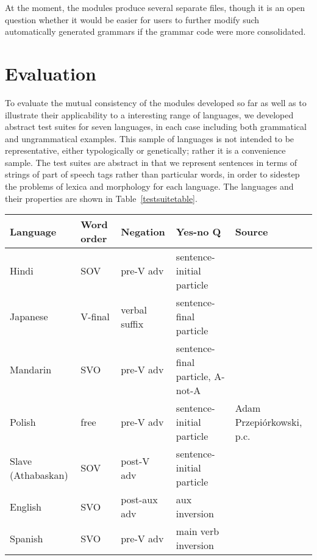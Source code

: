 At the moment, the modules produce
several separate files, though it is an open question whether
it would be easier for users to further modify such automatically
generated grammars if the grammar code were more consolidated.

\section{Evaluation}

To evaluate the mutual consistency of the modules developed so far as
well as to illustrate their applicability to a interesting range of
languages, we developed abstract test suites for seven languages, in
each case including both grammatical and ungrammatical examples.  This
sample of languages is not intended to be representative, either
typologically or genetically; rather it is a convenience sample.  The
test suites are abstract in that we represent sentences in terms of
strings of part of speech tags rather than particular words, in order
to sidestep the problems of lexica and morphology for each language.
The languages and their properties are shown in
Table~\ref{testsuitetable}.

\begin{table*}[ht]
\begin{center}
\small
\begin{tabular}{lllll}
\hline
Language & Word order & Negation & Yes-no Q\footnotemark & Source\\ \hline
Hindi    & SOV        & pre-V adv 	& sentence-initial particle& \cite{Sne:Wei:00}\\
Japanese & V-final    & verbal suffix   & sentence-final particle & \\
Mandarin & SVO	      & pre-V adv	& sentence-final particle, A-not-A & \cite{Li*81}\\
Polish   & free	      & pre-V adv       & sentence-initial particle & Adam Przepi\'{o}rkowski, p.c.\\
Slave (Athabaskan) & SOV & post-V adv	& sentence-initial particle & \cite{Rice89}\\
English  & SVO	      & post-aux adv\footnotemark	& aux inversion &\\
Spanish  & SVO	      & pre-V adv	& main verb inversion & \\ \hline
\end{tabular}
\end{center}
\caption{Languages used in testing}
\label{testsuitetable}
\end{table*}

